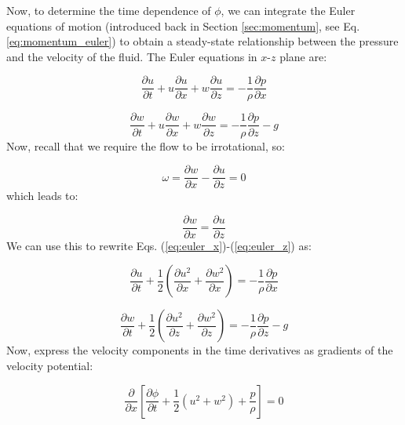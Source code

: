 \documentclass[12pt]{article}
\numberwithin{equation}{section}
\numberwithin{figure}{section}
\numberwithin{table}{section}
\begin{document}
Now, to determine the time dependence of $\phi$, we can integrate the Euler
equations of motion (introduced back in Section \ref{sec:momentum}, see
Eq. \ref{eq:momentum_euler}) to obtain a steady-state relationship between the
pressure and the velocity of the fluid.
The Euler equations in $x$-$z$ plane are:

\begin{equation}
  \frac{\partial u}{\partial t} +
  u \frac{\partial u}{\partial x} +
  w \frac{\partial u}{\partial z} =
  - \frac{1}{\rho} \frac{\partial p}{\partial x}
  \label{eq:euler_x}
\end{equation}

\begin{equation}
  \frac{\partial w}{\partial t} +
  u \frac{\partial w}{\partial x} +
  w \frac{\partial w}{\partial z} =
  - \frac{1}{\rho} \frac{\partial p}{\partial z}
  - g
  \label{eq:euler_z}
\end{equation}
Now, recall that we require the flow to be irrotational, so:

\begin{equation}
  \omega = \frac{\partial w}{\partial x} - \frac{\partial u}{\partial z} = 0
\end{equation}
which leads to:

\begin{equation}
  \frac{\partial w}{\partial x} = \frac{\partial u}{\partial z}
\end{equation}
We can use this to rewrite Eqs. (\ref{eq:euler_x})-(\ref{eq:euler_z}) as:

\begin{equation}
  \frac{\partial u}{\partial t} +
  \frac{1}{2} \left( \frac{\partial u^2}{\partial x} + \frac{\partial w^2}{\partial x} \right) =
  - \frac{1}{\rho} \frac{\partial p}{\partial x}
\end{equation}

\begin{equation}
  \frac{\partial w}{\partial t} +
  \frac{1}{2} \left( \frac{\partial u^2}{\partial z} + \frac{\partial w^2}{\partial z} \right) =
  - \frac{1}{\rho} \frac{\partial p}{\partial z} - g
\end{equation}
Now, express the velocity components in the time derivatives as gradients of the
velocity potential:

\begin{equation}
  \frac{\partial}{\partial x} \left[
    \frac{\partial \phi}{\partial t} +
    \frac{1}{2} \left(u^2 + w^2\right) +
    \frac{p}{\rho}
  \right] = 0
\end{equation}
\end{document}
